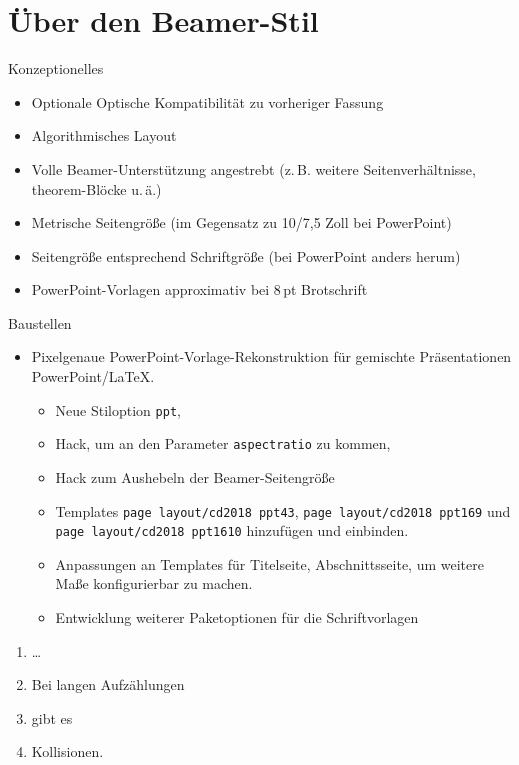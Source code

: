 \section{Über den Beamer-Stil}
\begin{frame}{Konzeptionelles}
  \begin{itemize}
  \item Optionale Optische Kompatibilität zu vorheriger Fassung
  \item<+-> Algorithmisches Layout
  \item<+-> Volle Beamer-Unterstützung angestrebt (z.\,B. weitere Seitenverhältnisse, theorem-Blöcke u.\,ä.)
  \item<+> Metrische Seitengröße (im Gegensatz zu 10/7,5 Zoll bei PowerPoint)
  \item<+> Seitengröße entsprechend Schriftgröße (bei PowerPoint anders herum)
  \item<+-> PowerPoint-Vorlagen approximativ bei 8\,pt Brotschrift
  \end{itemize}
\end{frame}
\begin{frame}{Baustellen}\label{baustellen}
  \begin{itemize}
  \item Pixelgenaue PowerPoint-Vorlage-Rekonstruktion für gemischte Präsentationen PowerPoint/\LaTeX.
    \begin{itemize}
    \item Neue Stiloption \texttt{ppt},
    \item Hack, um an den Parameter \texttt{aspectratio} zu kommen,
    \item Hack zum Aushebeln der Beamer-Seitengröße
    \item Templates \texttt{page layout/cd2018 ppt43}, \texttt{page
        layout/cd2018 ppt169} und \texttt{page layout/cd2018 ppt1610}
      hinzufügen und einbinden.
    \item Anpassungen an Templates für Titelseite, Abschnittsseite, um
      weitere Maße konfigurierbar zu machen.
    \item Entwicklung weiterer Paketoptionen für die Schriftvorlagen
    \end{itemize}
  \end{itemize}
  \begin{enumerate}
  \item \dots\setcounter{enumi}{8}
  \item Bei langen Aufzählungen
  \item gibt es
  \item Kollisionen.
  \end{enumerate}
\end{frame}

